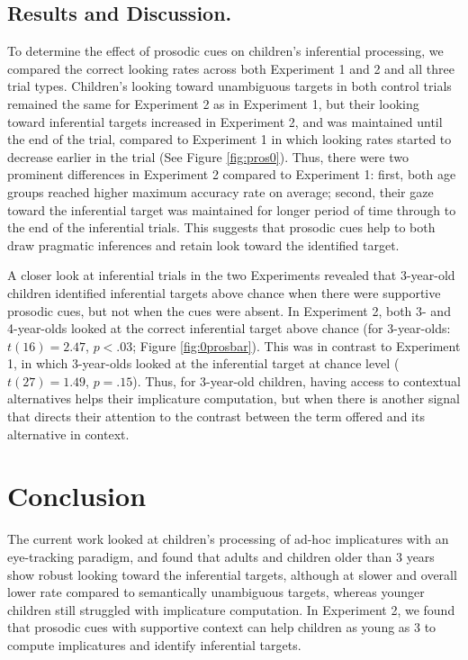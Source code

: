 \documentclass[10pt,letterpaper]{article}
\begin{document}
\subsection{Results and Discussion.}

To determine the effect of prosodic cues on children's inferential processing, we compared the correct looking rates across both Experiment 1 and 2 and all three trial types. Children's looking toward unambiguous targets in both control trials remained the same for Experiment 2 as in Experiment 1, but their looking toward inferential targets increased in Experiment 2, and was maintained until the end of the trial, compared to Experiment 1 in which looking rates started to decrease earlier in the trial (See Figure \ref{fig:pros0}). Thus, there were two prominent differences in Experiment 2 compared to Experiment 1: first, both age groups reached higher maximum accuracy rate on average; second, their gaze toward the inferential target was maintained for longer period of time through to the end of the inferential trials. This suggests that prosodic cues help to both draw pragmatic inferences and retain look toward the identified target. 

A closer look at inferential trials in the two Experiments revealed that 3-year-old children identified inferential targets above chance when there were supportive prosodic cues, but not when the cues were absent. In Experiment 2, both 3- and 4-year-olds looked at the correct inferential target above chance (for 3-year-olds: $t(16) = 2.47$, $p < .03$; Figure \ref{fig:0prosbar}). This was in contrast to Experiment 1, in which 3-year-olds looked at the inferential target at chance level ($t(27) = 1.49$, $p = .15$). Thus, for 3-year-old children, having access to contextual alternatives helps their implicature computation, but when there is another signal that directs their attention to the contrast between the term offered and its alternative in context. 

\section{Conclusion}

The current work looked at children's processing of ad-hoc implicatures with an eye-tracking paradigm, and found that adults and children older than 3 years show robust looking toward the inferential targets, although at slower and overall lower rate compared to semantically unambiguous targets, whereas younger children still struggled with implicature computation. In Experiment 2, we found that prosodic cues with supportive context can help children as young as 3 to compute implicatures and identify inferential targets. 
\end{document}
